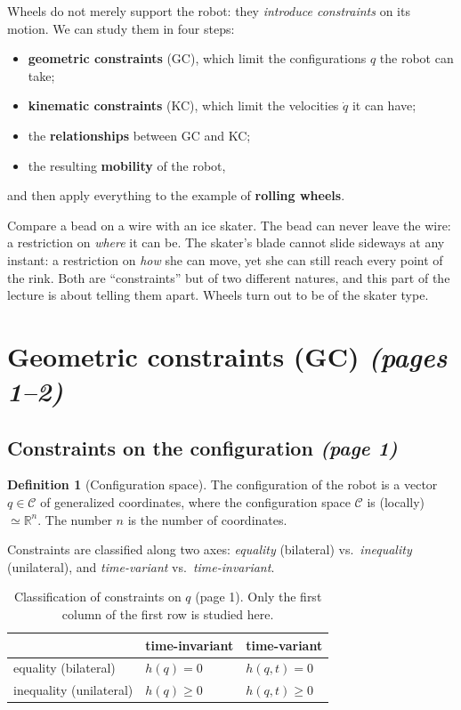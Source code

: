 \documentclass[11pt,a4paper]{article}
\theoremstyle{definition}
\newtheorem{definition}{Definition}[section]
\theoremstyle{plain}
\begin{document}
Wheels do not merely support the robot: they \emph{introduce constraints} on its motion. We can study them in four steps:
\begin{itemize}[nosep]
  \item \textbf{geometric constraints} (GC), which limit the configurations $q$ the robot can take;
  \item \textbf{kinematic constraints} (KC), which limit the velocities $\dot q$ it can have;
  \item the \textbf{relationships} between GC and KC;
  \item the resulting \textbf{mobility} of the robot,
\end{itemize}
and then apply everything to the example of \textbf{rolling wheels}.
 
\begin{intuition}
Compare a bead on a wire with an ice skater. The bead can never leave the wire: a restriction on \emph{where} it can be. The skater's blade cannot slide sideways at any instant: a restriction on \emph{how} she can move, yet she can still reach every point of the rink. Both are ``constraints'' but of two different natures, and this part of the lecture is about telling them apart. Wheels turn out to be of the skater type.
\end{intuition}
 
\section{Geometric constraints (GC) \emph{(pages 1--2)}}
 
\subsection{Constraints on the configuration \emph{(page 1)}}
 
\begin{definition}[Configuration space]
The configuration of the robot is a vector $q\in\mathcal C$ of generalized coordinates, where the configuration space $\mathcal C$ is (locally) $\simeq\mathbb R^n$. The number $n$ is the number of coordinates.
\end{definition}
 
Constraints are classified along two axes: \emph{equality} (bilateral) vs.\ \emph{inequality} (unilateral), and \emph{time-variant} vs.\ \emph{time-invariant}.
 
\begin{table}[H]
\centering\small
\begin{tabular}{@{}lll@{}}
\toprule
 & time-invariant & time-variant\\
\midrule
equality (bilateral) & $h(q)=0$ & $h(q,t)=0$\\
inequality (unilateral) & $h(q)\ge 0$ & $h(q,t)\ge 0$\\
\bottomrule
\end{tabular}
\caption{Classification of constraints on $q$ (page 1). Only the first column of the first row is studied here.}
\end{table}
 
\end{document}

